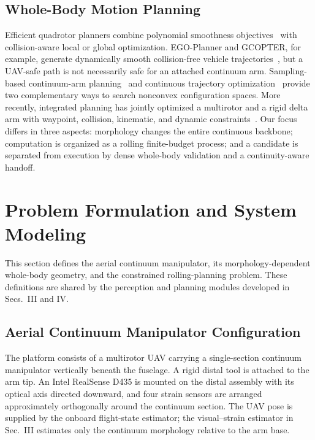 \documentclass[journal,twoside]{IEEEtran}
\begin{document}
\subsection{Whole-Body Motion Planning}
Efficient quadrotor planners combine polynomial smoothness objectives~\cite{mellinger2011minsnap} with collision-aware local or global optimization. EGO-Planner and GCOPTER, for example, generate dynamically smooth collision-free vehicle trajectories~\cite{zhou2021egoplanner,wang2022gcopter}, but a UAV-safe path is not necessarily safe for an attached continuum arm. Sampling-based continuum-arm planning~\cite{karaman2011sampling,meng2022rrtstar} and continuous trajectory optimization~\cite{schulman2014trajopt} provide two complementary ways to search nonconvex configuration spaces. More recently, integrated planning has jointly optimized a multirotor and a rigid delta arm with waypoint, collision, kinematic, and dynamic constraints~\cite{deng2025wholebody}. Our focus differs in three aspects: morphology changes the entire continuous backbone; computation is organized as a rolling finite-budget process; and a candidate is separated from execution by dense whole-body validation and a continuity-aware handoff.

\section{Problem Formulation and System Modeling}
This section defines the aerial continuum manipulator, its morphology-dependent whole-body geometry, and the constrained rolling-planning problem. These definitions are shared by the perception and planning modules developed in Secs.~III and IV.

\subsection{Aerial Continuum Manipulator Configuration}
The platform consists of a multirotor UAV carrying a single-section continuum manipulator vertically beneath the fuselage. A rigid distal tool is attached to the arm tip. An Intel RealSense D435 is mounted on the distal assembly with its optical axis directed downward, and four strain sensors are arranged approximately orthogonally around the continuum section. The UAV pose is supplied by the onboard flight-state estimator; the visual--strain estimator in Sec.~III estimates only the continuum morphology relative to the arm base.
\end{document}
